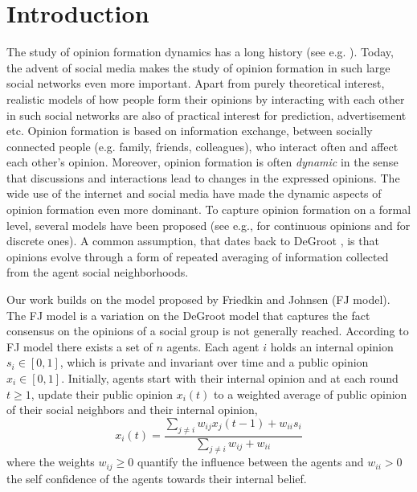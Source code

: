 \section{Introduction}

The study of opinion formation dynamics has a long history (see e.g.
\cite{Jackson}).  Today, the advent of social media makes the study of opinion
formation in such large social networks even more important.  Apart from purely
theoretical interest, realistic models of how people form their opinions by
interacting with each other in such social networks are also of practical
interest for prediction, advertisement etc.  Opinion formation is based on
information exchange, between socially connected people (e.g. family, friends,
colleagues), who interact often and affect each other's opinion.  Moreover,
opinion formation is often \emph{dynamic} in the sense that discussions and
interactions lead to changes in the expressed opinions. The wide use of the
internet and social media have made the dynamic aspects of opinion formation
even more dominant.  To capture opinion formation on a formal level, several
models have been proposed (see e.g., \cite{DeGroot,FJ90,HK,BKO11} for
continuous opinions and \cite{FGV12,YOASS13,BFM16} for discrete ones).  A
common assumption, that dates back to DeGroot \cite{DeGroot}, is that opinions
evolve through a form of repeated averaging of information collected from the
agent social neighborhoods.

Our work builds on the model proposed by Friedkin and Johnsen \cite{FJ90}(FJ
model).  The FJ model is a variation on the DeGroot model that captures the
fact consensus on the opinions of a social group is not generally reached.
According to FJ model there exists a set of $n$ agents.  Each agent $i$ holds
an internal opinion $s_i\in [0,1]$, which is private and invariant over time
and a public opinion $x_i \in [0,1]$.  Initially, agents start with their
internal opinion and at each round $t\geq1$, update their public opinion
$x_i(t)$ to a weighted average of public opinion of their social neighbors and
their internal opinion,
%
\begin{equation}\label{eq:FJ_model}
  x_i(t)= \frac{\sum_{j\neq i}w_{ij}x_j(t-1) + w_{ii}s_i}{\sum_{j\neq
      i}w_{ij}+w_{ii}}
\end{equation}
%
where the weights $w_{ij}\geq 0$ quantify the influence between the agents and
$w_{ii}>0$ the self confidence of the agents towards their internal belief.


